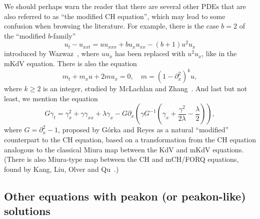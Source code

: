 \documentclass[10pt,a4paper]{article} \pdfoutput=1 
\begin{document}
We should perhaps warn the reader that there are several other PDEs that are also referred to
as ``the modified CH equation'', which may lead to some confusion when browsing the literature.
For example,
there is the case $b=2$ of the ``modified $b$-family''
\begin{equation}
  u_t - u_{xxt} = u u_{xxx} + b u_x u_{xx} - (b+1) u^2 u_x
\end{equation}
introduced by Wazwaz~\cite{wazwaz:2006:modified-CH-DP-b-family-solitary-waves},
where $uu_x$ has been replaced with $u^2 u_x$, like in the mKdV equation.
There is also the equation
\begin{equation}
  m_t + m_x u + 2mu_x = 0
  ,\quad
  m=(1-\partial_x^2)^k u
  ,
\end{equation}
where $k \ge 2$ is an integer,
studied by McLachlan and Zhang~\cite{mclachlan-zhang:2009:wellposedness-of-modified-CH-equations}.
And last but not least, we mention the equation
\begin{equation}
  G \gamma_t = \gamma_x^2 + \gamma \gamma_{xx} + \lambda \gamma_x
  - G \partial_x \left( \gamma G^{-1} \left( \gamma_x + \frac{\gamma^2}{2\lambda} - \frac{\lambda}{2} \right) \right)
  ,
\end{equation}
where $G = \partial_x^2 - 1$,
proposed by Górka and Reyes \cite[eq.~(5.6)]{gorka-reyes:2011:modified-CH-but-not-FORQ}
as a natural ``modified'' counterpart to the CH equation,
based on a transformation from the CH equation
analogous to the classical Miura map between the KdV and mKdV equations.
(There is also Miura-type map between the CH and mCH/FORQ equations,
found by Kang, Liu, Olver and Qu~\cite{kang-liu-olver-qu:2016:liouville-correspondence-between-mKdV-hierarchy-and-its-dual-mCH-hierarchy}.)




\subsection{Other equations with peakon (or peakon-like) solutions}
\label{sec:guide-other}
\end{document}
